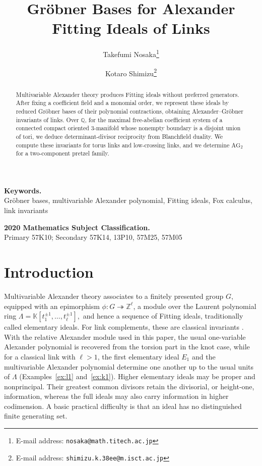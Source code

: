 \documentclass{article}
\title{Gr\"obner Bases for Alexander Fitting Ideals of Links}
\author{Takefumi Nosaka\footnote{E-mail address: {\tt nosaka@math.titech.ac.jp}}
 \and Kotaro Shimizu\footnote{E-mail address: {\tt shimizu.k.38ee@m.isct.ac.jp}}}
\date{}
\theoremstyle{definition}
\theoremstyle{plain}
\newcommand{\AG}{\mathrm{AG}}
\newcommand{\Z}{\mathbb{Z}}
\newcommand{\K}{\mathbb{K}}
\begin{document}
\maketitle

\begin{abstract}
Multivariable Alexander theory produces Fitting ideals without preferred
generators.  After fixing a coefficient field and a monomial order, we
represent these ideals by reduced Gr\"obner bases of their polynomial
contractions, obtaining Alexander--Gr\"obner invariants of links.
Over \(\mathbb Q\), for the maximal free-abelian coefficient system of
a connected compact oriented \(3\)-manifold whose nonempty boundary is
a disjoint union of tori, we deduce determinant-divisor reciprocity 
from Blanchfield duality.
We compute these invariants for torus links and low-crossing links, and
we determine \(\AG_2\) for a two-component pretzel family.
\end{abstract}

\begin{center}
\normalsize
\baselineskip=11pt
{\bf Keywords.}\\
Gr\"obner bases, multivariable Alexander polynomial, Fitting ideals, Fox calculus, link invariants
\end{center}

\begin{center}
\normalsize
\baselineskip=11pt
{\bf 2020 Mathematics Subject Classification.}\\
Primary 57K10; Secondary 57K14, 13P10, 57M25, 57M05
\end{center}

\section{Introduction}\label{sec:introduction}

Multivariable Alexander theory associates to a finitely presented group
\(G\), equipped with an epimorphism
\(\phi\colon G\twoheadrightarrow\Z^\ell\), a module over the Laurent
polynomial ring
$
 \Lambda=\K[t_1^{\pm1},\dots,t_\ell^{\pm1}],
$
and hence a sequence of Fitting ideals, traditionally called elementary
ideals.  For link complements, these are classical invariants
\cite{CF,FT54}.  With the relative Alexander module used in this paper,
the usual one-variable Alexander polynomial is recovered from the torsion
part in the knot case, while for a classical link with \(\ell>1\), the
first elementary ideal \(E_1\) and the multivariable Alexander polynomial
determine one another up to the usual units of \(\Lambda\)
(Examples~\ref{ex:l1} and~\ref{ex:k1}).  Higher elementary ideals may be
proper and nonprincipal.  Their greatest common divisors retain the
divisorial, or height-one, information, whereas the full ideals may also
carry information in higher codimension.  A basic practical difficulty is
that an ideal has no distinguished finite generating set.
\end{document}
